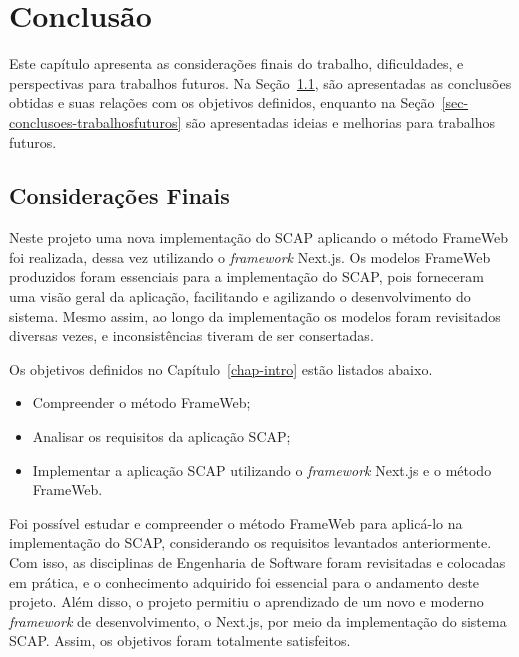 \chapter{Conclusão}
\label{chap-conclusao}


Este capítulo apresenta as considerações finais do trabalho, dificuldades, e perspectivas para trabalhos futuros.
Na Seção~\ref{sec-conclusoes-consideracoes}, são apresentadas as conclusões obtidas e suas relações com os objetivos definidos, enquanto
na Seção~\ref{sec-conclusoes-trabalhosfuturos} são apresentadas ideias e melhorias para trabalhos futuros.

\section{Considerações Finais}
\label{sec-conclusoes-consideracoes}

Neste projeto uma nova implementação do SCAP aplicando o método FrameWeb foi realizada, dessa vez utilizando o \textit{framework} Next.js.
Os modelos FrameWeb produzidos foram essenciais para a implementação do SCAP, pois forneceram uma visão geral da aplicação, facilitando e agilizando o desenvolvimento do sistema.
Mesmo assim, ao longo da implementação os modelos foram revisitados diversas vezes, e inconsistências tiveram de ser consertadas.

Os objetivos definidos no Capítulo~\ref{chap-intro} estão listados abaixo.
\begin{itemize}
    \item Compreender o método FrameWeb;
    \item Analisar os requisitos da aplicação SCAP;
    \item Implementar a aplicação SCAP utilizando o \textit{framework} Next.js e o método FrameWeb.
\end{itemize}

Foi possível estudar e compreender o método FrameWeb para aplicá-lo na implementação do SCAP, considerando os requisitos levantados anteriormente.
Com isso, as disciplinas de Engenharia de Software foram revisitadas e colocadas em prática, e o conhecimento adquirido foi essencial para o andamento deste projeto.
Além disso, o projeto permitiu o aprendizado de um novo e moderno \textit{framework} de desenvolvimento, o Next.js, por meio da implementação do sistema SCAP.
Assim, os objetivos foram totalmente satisfeitos.


